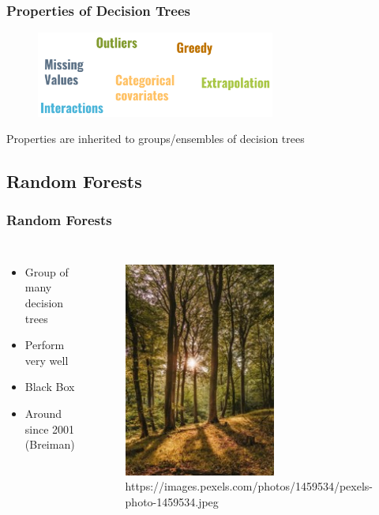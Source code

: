 \documentclass[
    utf8,
    aspectratio=169
]{beamer}  %
\begin{document}
\begin{frame}
	\frametitle{Properties of Decision Trees}
	\begin{figure}
		\includegraphics[width=0.7\textwidth]{pics/tree_words.png}
	\end{figure}
	
	\vfill
	
	\centering Properties are inherited to groups/ensembles of decision trees
\end{frame}

\subsection{Random Forests}

\begin{frame}
	\frametitle{Random Forests}
	\begin{columns}[onlytextwidth]
		\begin{itemize}
			\item Group of many decision trees
			\item Perform very well
			\item Black Box
			\item Around since 2001 (Breiman)
		\end{itemize}
		
		\begin{figure}
			\includegraphics[width=0.6\textwidth]{pics/real_forest.jpg}
			\tiny{https://images.pexels.com/photos/1459534/pexels-photo-1459534.jpeg}
		\end{figure}
	\end{columns}
\end{frame}
\end{document}
